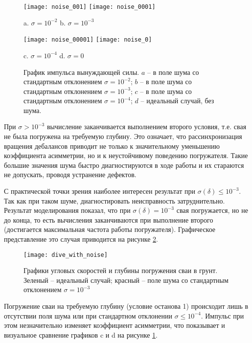 \begin{figure}[ht]
    \centering
    \texttt{[image: noise\_001]}
    \texttt{[image: noise\_0001]}

    a. $\sigma = 10^{-2}$ \hspace{5cm} b. $\sigma = 10^{-3}$

    \texttt{[image: noise\_00001]}
    \texttt{[image: noise\_0]}

    c. $\sigma = 10^{-4}$ \hspace{5cm} d. $\sigma = 0$
    \caption{График импульса вынуждающей силы.
    $a$ -- в поле шума со стандартным отклонением $\sigma = 10^{-2}$;
    $b$ -- в поле шума со стандартным отклонением $\sigma = 10^{-3}$;
    $c$ -- в поле шума со стандартным отклонением $\sigma = 10^{-4}$;
    $d$ -- идеальный случай, без шума.}
    \label{fig:impulse-noise}
\end{figure}

При $\sigma > 10^{-3}$ вычисление заканчивается выполнением второго условия, т.е. свая не была погружена на требуемую глубину.
Это означает, что рассинхронизация вращения дебалансов приводит не только к значительному уменьшению коэффициента асимметрии,
но и к неустойчивому поведению погружателя. Такие большие значения шума быстро диагностируются в ходе работы и их стараются не
допускать, проводя устранение дефектов.

С практической точки зрения наиболее интересен результат при $\sigma(\delta) \leq 10^{-3}$. Так как при таком шуме, диагностировать
неисправность затруднительно. Результат моделирования показал, что при $\sigma(\delta) = 10^{-3}$ свая погружается, но не до конца,
то есть вычисления заканчиваются при выполнение второго (достигается максимальная частота работы погружателя). Графическое представление
это случая приводится на рисунке \ref{fig:dive_with_noise}.

\begin{figure}[ht]
    \centering
    \texttt{[image: dive\_with\_noise]}
    \caption{Графики угловых скоростей и глубины погружения сваи в грунт.
    Зеленый -- идеальный случай; красный -- поле шума со стандартным отклонением $\sigma = 10^{-3}$}
    \label{fig:dive_with_noise}
\end{figure}

Погружение сваи на требуемую глубину (условие останова 1) происходит лишь в отсутствии поля шума или
при стандартном отклонении $\sigma \leq 10^{-4}$. Импульс при этом незначительно изменяет коэффициент асимметрии,
что показывает и визуальное сравнение графиков c и d на рисунке \ref{fig:impulse-noise}.

